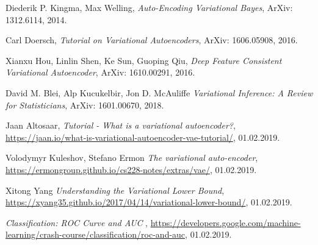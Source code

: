  

\begin{thebibliography}{9}
  
\bibitem{}
  Diederik P. Kingma, Max Welling,
  \emph{Auto-Encoding Variational Bayes},
  ArXiv: 1312.6114, 
  2014.
  
\bibitem{}
  Carl Doersch,
  \emph{Tutorial on Variational Autoencoders},
  ArXiv: 1606.05908, 
  2016.
  
\bibitem{}
  Xianxu Hou, Linlin Shen, Ke Sun, Guoping Qiu,
  \emph{Deep Feature Consistent Variational Autoencoder},
  ArXiv: 1610.00291, 
  2016.
  
\bibitem{}
  David M. Blei, Alp Kucukelbir, Jon D. McAuliffe
  \emph{Variational Inference: A Review for Statisticians},
  ArXiv: 1601.00670, 
  2018.
  
\bibitem{}
  Jaan Altosaar,
  \emph{Tutorial - What is a variational autoencoder?},
  \url{https://jaan.io/what-is-variational-autoencoder-vae-tutorial/}, 
  01.02.2019.
  
\bibitem{}
  Volodymyr Kuleshov, Stefano Ermon
  \emph{The variational auto-encoder},
  \url{https://ermongroup.github.io/cs228-notes/extras/vae/}, 
  01.02.2019.
  
\bibitem{}
  Xitong Yang
  \emph{Understanding the Variational Lower Bound},
  \url{https://xyang35.github.io/2017/04/14/variational-lower-bound/}, 
  01.02.2019.
  
\bibitem{}
  \emph{Classification: ROC Curve and AUC },
  \url{https://developers.google.com/machine-learning/crash-course/classification/roc-and-auc}, 
  01.02.2019.

\end{thebibliography}
